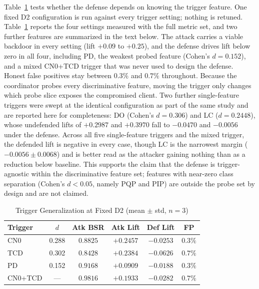 \documentclass[journal]{IEEEtran}
\begin{document}
Table~\ref{tab:trigger} tests whether the defense depends on knowing the trigger feature. One fixed D2 configuration is run against every trigger setting; nothing is retuned. Table~\ref{tab:trigger} reports the four settings measured with the full metric set, and two further features are summarized in the text below. The attack carries a viable backdoor in every setting (lift $+0.09$ to $+0.25$), and the defense drives lift below zero in all four, including PD, the weakest probed feature (Cohen's $d = 0.152$), and a mixed CN0+TCD trigger that was never used to design the defense. Honest false positives stay between $0.3\%$ and $0.7\%$ throughout. Because the coordinator probes every discriminative feature, moving the trigger only changes which probe slice exposes the compromised client. Two further single-feature triggers were swept at the identical configuration as part of the same study and are reported here for completeness: DO (Cohen's $d = 0.306$) and LC ($d = 0.2448$), whose undefended lifts of $+0.2987$ and $+0.3970$ fall to $-0.0470$ and $-0.0056$ under the defense. Across all five single-feature triggers and the mixed trigger, the defended lift is negative in every case, though LC is the narrowest margin ($-0.0056 \pm 0.0068$) and is better read as the attacker gaining nothing than as a reduction below baseline. This supports the claim that the defense is trigger-agnostic within the discriminative feature set; features with near-zero class separation (Cohen's $d < 0.05$, namely PQP and PIP) are outside the probe set by design and are not claimed.

\begin{table}[!t]
\renewcommand{\arraystretch}{1.25}
\caption{Trigger Generalization at Fixed D2 (mean $\pm$ std, $n=3$)}
\label{tab:trigger}
\centering
\footnotesize
\setlength{\tabcolsep}{3pt}
\begin{tabular}{lccccc}
\toprule
\textbf{Trigger} & \textbf{$d$} & \textbf{Atk BSR} & \textbf{Atk Lift} & \textbf{Def Lift} & \textbf{FP} \\
\midrule
CN0        & 0.288 & $0.8825$ & $+0.2457$ & $-0.0253$ & $0.3\%$ \\
TCD        & 0.302 & $0.8428$ & $+0.2384$ & $-0.0626$ & $0.7\%$ \\
PD         & 0.152 & $0.9168$ & $+0.0909$ & $-0.0188$ & $0.3\%$ \\
CN0+TCD    & ---   & $0.9816$ & $+0.1933$ & $-0.0282$ & $0.7\%$ \\
\bottomrule
\end{tabular}
\end{table}
\end{document}

